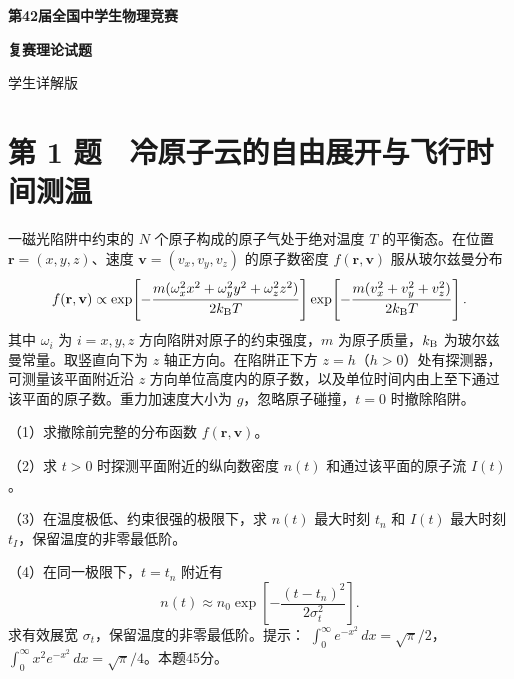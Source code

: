 \documentclass[12pt,a4paper,fontset=fandol]{ctexart}
\begin{document}
\begin{titlepage}
\thispagestyle{empty}
\vspace*{27mm}
\begin{center}
{\LARGE\bfseries 第42届全国中学生物理竞赛\par}
\vspace{8mm}
{\LARGE\bfseries 复赛理论试题\par}
\vspace{17mm}
{\Large 学生详解版\par}
\end{center}
\vfill
\end{titlepage}
\setcounter{page}{1}
\section{第 1
题　冷原子云的自由展开与飞行时间测温}\label{ux7b2c-1-ux9898-ux51b7ux539fux5b50ux4e91ux7684ux81eaux7531ux5c55ux5f00ux4e0eux98deux884cux65f6ux95f4ux6d4bux6e29}

一磁光陷阱中约束的 \(N\) 个原子构成的原子气处于绝对温度 \(T\)
的平衡态。在位置 \(\mathbf r=(x,y,z)\)、速度 \(\mathbf v=(v_x,v_y,v_z)\)
的原子数密度 \(f(\mathbf r,\mathbf v)\) 服从玻尔兹曼分布 \[
f(\mathbf r,\mathbf v)\propto
\exp\!\left[-\frac{m(\omega_x^2x^2+\omega_y^2y^2+\omega_z^2z^2)}{2k_{\rm B}T}\right]
\exp\!\left[-\frac{m(v_x^2+v_y^2+v_z^2)}{2k_{\rm B}T}\right].
\] 其中 \(\omega_i\) 为 \(i=x,y,z\) 方向陷阱对原子的约束强度，\(m\)
为原子质量，\(k_{\rm B}\) 为玻尔兹曼常量。取竖直向下为 \(z\)
轴正方向。在陷阱正下方 \(z=h\)（\(h>0\)）处有探测器，可测量该平面附近沿
\(z\)
方向单位高度内的原子数，以及单位时间内由上至下通过该平面的原子数。重力加速度大小为
\(g\)，忽略原子碰撞，\(t=0\) 时撤除陷阱。

（1）求撤除前完整的分布函数 \(f(\mathbf r,\mathbf v)\)。

（2）求 \(t>0\) 时探测平面附近的纵向数密度 \(n(t)\) 和通过该平面的原子流
\(I(t)\)。

（3）在温度极低、约束很强的极限下，求 \(n(t)\) 最大时刻 \(t_n\) 和
\(I(t)\) 最大时刻 \(t_I\)，保留温度的非零最低阶。

（4）在同一极限下，\(t=t_n\) 附近有 \[
n(t)\approx n_0\exp\!\left[-\frac{(t-t_n)^2}{2\sigma_t^2}\right].
\] 求有效展宽 \(\sigma_t\)，保留温度的非零最低阶。提示：
\(\int_0^\infty e^{-x^2}\,dx=\sqrt\pi/2\)，
\(\int_0^\infty x^2e^{-x^2}\,dx=\sqrt\pi/4\)。本题45分。
\end{document}
